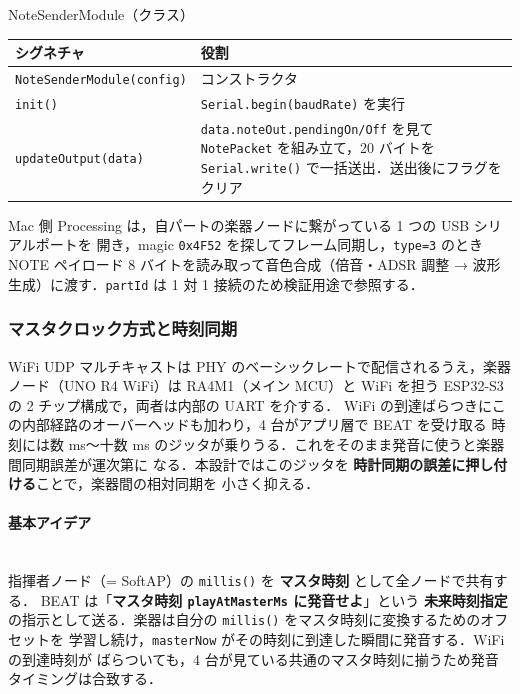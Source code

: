 \documentclass[lualatex,book,paper=a4paper,jafontsize=11.5pt,jafontscale=1.05]{jlreq}
\begin{document}
\begin{apibox}{NoteSenderModule（クラス）}
\begin{tabular}{l p{}}
\toprule
\textbf{シグネチャ} & \textbf{役割} \\
\midrule
\texttt{NoteSenderModule(config)} & コンストラクタ \\
\texttt{init()}                   & \texttt{Serial.begin(baudRate)} を実行 \\
\texttt{updateOutput(data)}       & \texttt{data.noteOut.pendingOn/Off} を見て \texttt{NotePacket} を組み立て，20 バイトを \texttt{Serial.write()} で一括送出．送出後にフラグをクリア \\
\bottomrule
\end{tabular}
\end{apibox}

Mac 側 Processing は，自パートの楽器ノードに繋がっている 1 つの USB シリアルポートを
開き，magic \texttt{0x4F52} を探してフレーム同期し，\texttt{type=3} のとき NOTE ペイロード
8 バイトを読み取って音色合成（倍音・ADSR 調整 → 波形生成）に渡す．\texttt{partId} は
1 対 1 接続のため検証用途で参照する．

\subsubsection{マスタクロック方式と時刻同期}\label{subsec:clock-sync}

WiFi UDP マルチキャストは PHY のベーシックレートで配信されるうえ，楽器ノード（UNO R4 WiFi）は
RA4M1（メイン MCU）と WiFi を担う ESP32-S3 の 2 チップ構成で，両者は内部の UART を介する．
WiFi の到達ばらつきにこの内部経路のオーバーヘッドも加わり，4 台がアプリ層で BEAT を受け取る
時刻には数 ms〜十数 ms のジッタが乗りうる．これをそのまま発音に使うと楽器間同期誤差が運次第に
なる．本設計ではこのジッタを \textbf{時計同期の誤差に押し付ける}ことで，楽器間の相対同期を
小さく抑える．

\paragraph{基本アイデア}\mbox{}\\
指揮者ノード（= SoftAP）の \texttt{millis()} を \textbf{マスタ時刻} として全ノードで共有する．
BEAT は「\textbf{マスタ時刻 \texttt{playAtMasterMs} に発音せよ}」という \textbf{未来時刻指定}
の指示として送る．楽器は自分の \texttt{millis()} をマスタ時刻に変換するためのオフセットを
学習し続け，\texttt{masterNow} がその時刻に到達した瞬間に発音する．WiFi の到達時刻が
ばらついても，4 台が見ている共通のマスタ時刻に揃うため発音タイミングは合致する．
\end{document}
